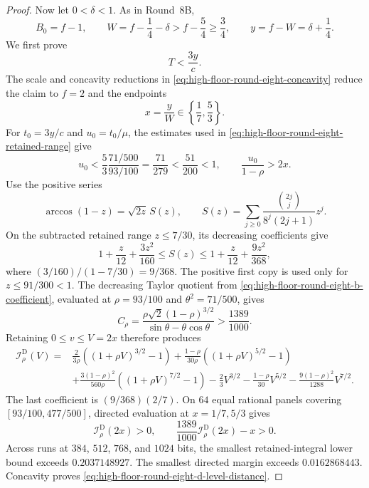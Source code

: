 \documentclass[11pt]{article}
\theoremstyle{remark}
\begin{document}
\begin{proof}
Now let $0<\delta<1$.  As in Round~8B,
\[
 B_0=f-1,\qquad
 W=f-\frac14-\delta>f-\frac54\geq\frac34,\qquad
 y=f-W=\delta+\frac14.
\]
We first prove
\begin{equation}
 \boxed{T<\frac{3y}{c}.}
 \label{eq:high-floor-round-eight-d-level-distance}
\end{equation}
The scale and concavity reductions in
\eqref{eq:high-floor-round-eight-concavity} reduce the claim to $f=2$
and the endpoints
\[
 x=\frac yW\in\left\{\frac17,\frac53\right\}.
\]
For $t_0=3y/c$ and $u_0=t_0/\mu$, the estimates used in
\eqref{eq:high-floor-round-eight-retained-range} give
\[
 u_0<
 \frac53\frac{71/500}{93/100}
 =\frac{71}{279}<\frac{51}{200}<1,\qquad
 \frac{u_0}{1-\rho}>2x.
\]
Use the positive series
\[
 \arccos(1-z)=\sqrt{2z}\,S(z),\qquad
 S(z)=\sum_{j\geq0}
 \frac{\binom{2j}{j}}{8^j(2j+1)}z^j.
\]
On the subtracted retained range $z\leq7/30$, its decreasing
coefficients give
\begin{equation}
 1+\frac z{12}+\frac{3z^2}{160}
 \leq S(z)\leq
 1+\frac z{12}+\frac{9z^2}{368},
 \label{eq:high-floor-round-eight-d-series}
\end{equation}
where $(3/160)/(1-7/30)=9/368$.  The positive first copy is used only
for $z\leq91/300<1$.  The decreasing Taylor quotient from
\eqref{eq:high-floor-round-eight-b-coefficient}, evaluated at
$\rho=93/100$ and $\theta^2=71/500$, gives
\begin{equation}
 C_\rho=
 \frac{\rho\sqrt2(1-\rho)^{3/2}}
 {\sin\theta-\theta\cos\theta}>
 \frac{1389}{1000}.
 \label{eq:high-floor-round-eight-d-coefficient}
\end{equation}
Retaining $0\leq v\leq V=2x$ therefore produces
\begin{equation}
\begin{aligned}
 \mathcal I^{\mathrm D}_\rho(V)
={}&\frac{2}{3\rho}
 \left((1+\rho V)^{3/2}-1\right)
 +\frac{1-\rho}{30\rho}
 \left((1+\rho V)^{5/2}-1\right)\\
&+\frac{3(1-\rho)^2}{560\rho}
 \left((1+\rho V)^{7/2}-1\right)
 -\frac23V^{3/2}-\frac{1-\rho}{30}V^{5/2}
 -\frac{9(1-\rho)^2}{1288}V^{7/2}.
\end{aligned}
 \label{eq:high-floor-round-eight-d-integral}
\end{equation}
The last coefficient is $(9/368)(2/7)$.  On $64$ equal rational panels
covering $[93/100,477/500]$, directed evaluation at
$x=1/7,5/3$ gives
\begin{equation}
 \mathcal I^{\mathrm D}_\rho(2x)>0,\qquad
 \frac{1389}{1000}\mathcal I^{\mathrm D}_\rho(2x)-x>0.
 \label{eq:high-floor-round-eight-d-panels}
\end{equation}
Across runs at $384$, $512$, $768$, and $1024$ bits, the smallest
retained-integral lower bound exceeds $0.2037148927$.  The smallest
directed margin exceeds $0.0162868443$.
Concavity proves \eqref{eq:high-floor-round-eight-d-level-distance}.


\end{proof}
\end{document}
